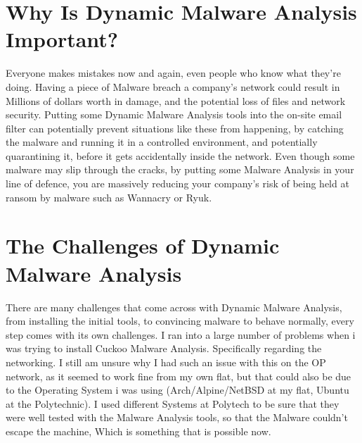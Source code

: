 \documentclass{article}
\begin{document}
\section*{Why Is Dynamic Malware Analysis Important?}
Everyone makes mistakes now and again, even people who know what they're doing.
Having a piece of Malware breach a company's network could result in Millions of
dollars worth in damage, and the potential loss of files and network security. 
Putting some Dynamic Malware Analysis tools into the on-site email filter can 
potentially prevent situations like these from happening, by catching the
malware and running it in a controlled environment, and potentially
quarantining it, before it gets accidentally inside the network. Even though
some malware may slip through the cracks, by putting some Malware Analysis in
your line of defence, you are massively reducing your company's risk of being 
held at ransom by malware such as Wannacry or Ryuk.

\section*{The Challenges of Dynamic Malware Analysis}
There are many challenges that come across with Dynamic Malware Analysis, from
installing the initial tools, to convincing malware to behave normally, every
step comes with its own challenges. 
I ran into a large number of problems when i was trying to install Cuckoo 
Malware Analysis. Specifically regarding the networking. I still am unsure why
I had such an issue with this on the OP network, as it seemed to work fine
from my own flat, but that could also be due to the Operating System i was 
using (Arch/Alpine/NetBSD at my flat, Ubuntu at the Polytechnic). I used 
different Systems at Polytech to be sure that they were well tested with the 
Malware Analysis tools, so that the Malware couldn't escape the machine, Which
is something that is possible now.
\end{document}

